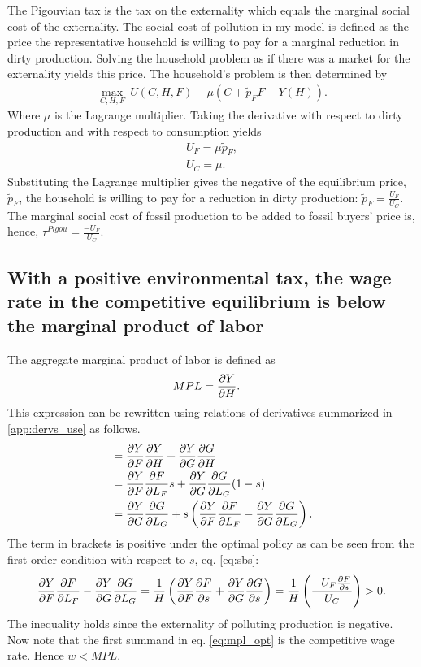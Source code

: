 The Pigouvian tax is the tax on the externality which equals the marginal social cost of the externality. 
The social cost of pollution in my model is defined as the price the representative household is willing to pay for a marginal reduction in dirty production. Solving the household problem as if there was a market for the externality yields this price. 
The household's problem is then determined by
\begin{align*}
	\underset{C,H,F}{\max}\ U(C,H,F)-\mu \left(C+\tilde{p}_FF-Y(H)\right).
\end{align*}
Where $\mu$ is the Lagrange multiplier. Taking the derivative with respect to dirty production  and with respect to consumption yields
\begin{align*}
	U_F=\mu \tilde{p}_F,\\
	U_C=\mu.
\end{align*}
Substituting the Lagrange multiplier gives the negative of the equilibrium price, $\tilde{p}_F$, the household is willing to pay for a reduction in dirty production: $\tilde{p}_F=\frac{U_F}{U_C}$. The marginal social cost of fossil production to be added to fossil buyers' price is, hence, $\tau^{Pigou}=\frac{-U_F}{U_C}$.

\subsection{With a positive environmental tax, the wage rate in the competitive equilibrium is below the marginal product of labor}\label{app:wageMPL}

The aggregate marginal product of labor is defined as
\begin{align}
MPL&= \frac{\partial{Y}}{\partial{H}}.\nonumber
\end{align}
This expression can be rewritten using relations of derivatives summarized in \ref{app:dervs_use} as follows.
\begin{align}
&= \frac{\partial{Y}}{\partial{F}}\frac{\partial{Y}}{\partial{H}}+\frac{\partial{Y}}{\partial{G}}\frac{\partial{G}}{\partial{H}}\nonumber\\
&= \frac{\partial{Y}}{\partial{F}}\frac{\partial{F}}{\partial{L_F}}s+\frac{\partial{Y}}{\partial{G}}\frac{\partial{G}}{\partial{L_G}}(1-s)\nonumber\\
&= \frac{\partial{Y}}{\partial{G}}\frac{\partial{G}}{\partial{L_G}}+ s\left(\frac{\partial{Y}}{\partial{F}}\frac{\partial{F}}{\partial{L_F}}-\frac{\partial{Y}}{\partial{G}}\frac{\partial{G}}{\partial{L_G}}\right).\label{eq:mpl_opt}
\end{align}
The term in brackets is positive under the optimal policy as can be seen from the first order condition with respect to $s$, eq. \eqref{eq:sbs}:
\begin{align}
\frac{\partial{Y}}{\partial{F}}\frac{\partial{F}}{\partial{L_F}}-\frac{\partial{Y}}{\partial{G}}\frac{\partial{G}}{\partial{L_G}}=\frac{1}{H}\left(\frac{\partial{Y}}{\partial{F}}\frac{\partial{F}}{\partial{s}}+\frac{\partial{Y}}{\partial{G}}\frac{\partial{G}}{\partial{s}}\right)=\frac{1}{H}\left(\frac{-U_F\frac{\partial{F}}{\partial{s}}}{U_C}\right)>0.\nonumber
\end{align}
The inequality holds since the externality of polluting production is negative. %
Now note that the first summand in eq. \eqref{eq:mpl_opt} is the competitive wage rate.  Hence $w<MPL$.

